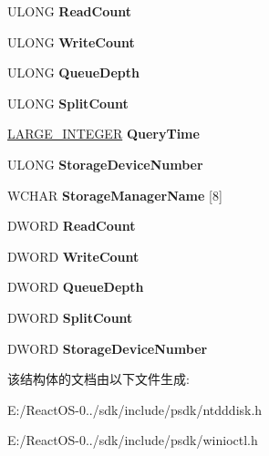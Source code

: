 \begin{DoxyCompactItemize}
U\+L\+O\+NG {\bfseries Read\+Count}
\item 
\mbox{\label{struct___d_i_s_k___p_e_r_f_o_r_m_a_n_c_e_ad0d6e96142588fcb356d6d333a5c000f}} 
U\+L\+O\+NG {\bfseries Write\+Count}
\item 
\mbox{\label{struct___d_i_s_k___p_e_r_f_o_r_m_a_n_c_e_a9a385904805d9bcd678db17d26d202d6}} 
U\+L\+O\+NG {\bfseries Queue\+Depth}
\item 
\mbox{\label{struct___d_i_s_k___p_e_r_f_o_r_m_a_n_c_e_a2e24e8e0daca676f22432ebca7f924ca}} 
U\+L\+O\+NG {\bfseries Split\+Count}
\item 
\mbox{\label{struct___d_i_s_k___p_e_r_f_o_r_m_a_n_c_e_a2bf81d4d9e63ba618caae08af845edfc}} 
\hyperlink{union___l_a_r_g_e___i_n_t_e_g_e_r}{L\+A\+R\+G\+E\+\_\+\+I\+N\+T\+E\+G\+ER} {\bfseries Query\+Time}
\item 
\mbox{\label{struct___d_i_s_k___p_e_r_f_o_r_m_a_n_c_e_a2e723c9bb0cde7617831817f64d0a085}} 
U\+L\+O\+NG {\bfseries Storage\+Device\+Number}
\item 
\mbox{\label{struct___d_i_s_k___p_e_r_f_o_r_m_a_n_c_e_a274b4e6ef4800b42434f55d19c335847}} 
W\+C\+H\+AR {\bfseries Storage\+Manager\+Name} \mbox{[}8\mbox{]}
\item 
\mbox{\label{struct___d_i_s_k___p_e_r_f_o_r_m_a_n_c_e_ae9312e808899d412d2e049b4f9b231bf}} 
D\+W\+O\+RD {\bfseries Read\+Count}
\item 
\mbox{\label{struct___d_i_s_k___p_e_r_f_o_r_m_a_n_c_e_a2a5a60c24d1ec415da2fd7e7137062fb}} 
D\+W\+O\+RD {\bfseries Write\+Count}
\item 
\mbox{\label{struct___d_i_s_k___p_e_r_f_o_r_m_a_n_c_e_a0382c035b6d6a5a21f706ce1bf48a1a5}} 
D\+W\+O\+RD {\bfseries Queue\+Depth}
\item 
\mbox{\label{struct___d_i_s_k___p_e_r_f_o_r_m_a_n_c_e_a107c7e194a35ecdbddfc1d3fc93df5a9}} 
D\+W\+O\+RD {\bfseries Split\+Count}
\item 
\mbox{\label{struct___d_i_s_k___p_e_r_f_o_r_m_a_n_c_e_afe0b8849fedafc6bc093303d33724217}} 
D\+W\+O\+RD {\bfseries Storage\+Device\+Number}
\end{DoxyCompactItemize}


该结构体的文档由以下文件生成\+:\begin{DoxyCompactItemize}
\item 
E\+:/\+React\+O\+S-\/0../sdk/include/psdk/ntdddisk.\+h\item 
E\+:/\+React\+O\+S-\/0../sdk/include/psdk/winioctl.\+h\end{DoxyCompactItemize}
